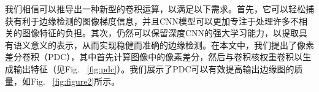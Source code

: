 \documentclass[10pt,twocolumn,letterpaper]{article}
\begin{document}
\begin{table}[t!]
\caption{在效率和准确性方面，我们与一些领先的边缘检测模型进行了比较。乘法累加（MACs）是基于200$ \times $200图像计算的，FPS和ODS \emph{F-measure}在BSDS500测试集上进行评估。}
\begin{center}
\setlength{\tabcolsep}{0.015\linewidth}
\end{center}
\label{table:table1}
\vspace{-0.2in}
\end{table}

我们相信可以推导出一种新型的卷积运算，以满足以下需求。首先，它可以轻松捕获有利于边缘检测的图像梯度信息，并且CNN模型可以更加专注于处理许多不相关的图像特征的负担。其次，仍然可以保留深度CNN的强大学习能力，以提取具有语义意义的表示，从而实现稳健而准确的边缘检测。在本文中，我们提出了像素差分卷积（PDC），其中首先计算图像中的像素差分，然后与卷积核权重卷积以生成输出特征（见Fig. ~\ref{fig:pdc}）。我们展示了PDC可以有效提高输出边缘图的质量，如Fig. ~\ref{fig:figure2}所示。
\end{document}
